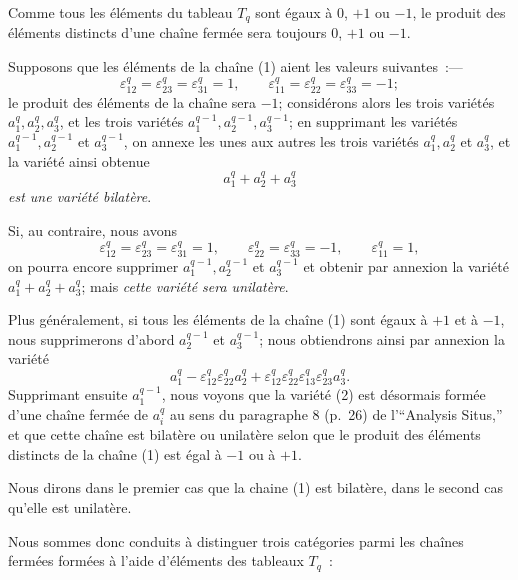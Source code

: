 \documentclass{article}
\begin{document}
Comme tous les éléments du tableau $T_{q}$ sont égaux à 0, $+1$ ou $-1$, le produit des éléments distincts d'une chaîne fermée sera toujours 0, $+1$ ou $-1$.

Supposons que les éléments de la chaîne (1) aient les valeurs suivantes~:---
\[ \varepsilon^{q}_{12} = \varepsilon^{q}_{23} = \varepsilon^{q}_{31} = 1, \qquad \varepsilon^{q}_{11} = \varepsilon^{q}_{22} = \varepsilon^{q}_{33} = -1; \]
le produit des éléments de la chaîne sera $-1$; considérons alors les trois variétés $a^{q}_{1}, a^{q}_{2}, a^{q}_{3}$, et les trois variétés $a^{q-1}_{1}, a^{q-1}_{2}, a^{q-1}_{3}$; en supprimant les variétés $a^{q-1}_{1}, a^{q-1}_{2}$ et $a^{q-1}_{3}$, on annexe les unes aux autres les trois variétés $a^{q}_{1}, a^{q}_{2}$ et $a^{q}_{3}$, et la variété ainsi obtenue
\[ a^{q}_{1} + a^{q}_{2} + a^{q}_{3} \]
\emph{est une variété bilatère}.

Si, au contraire, nous avons
\[ \varepsilon^{q}_{12} = \varepsilon^{q}_{23} = \varepsilon^{q}_{31} = 1, \qquad \varepsilon^{q}_{22} = \varepsilon^{q}_{33} = -1, \qquad \varepsilon^{q}_{11} = 1, \]
on pourra encore supprimer $a^{q-1}_{1}, a^{q-1}_{2}$ et $a^{q-1}_{3}$ et obtenir par annexion la variété $a^{q}_{1} + a^{q}_{2} + a^{q}_{3}$; mais \emph{cette variété sera unilatère}.

Plus généralement, si tous les éléments de la chaîne (1) sont égaux
à $+1$ et à $-1$, nous supprimerons d'abord $a^{q-1}_{2}$ et $a^{q-1}_{3}$; nous obtiendrons ainsi par annexion la variété
\[ a^{q}_{1} - \varepsilon^{q}_{12} \varepsilon^{q}_{22} a^{q}_{2} + \varepsilon^{q}_{12} \varepsilon^{q}_{22} \varepsilon^{q}_{13} \varepsilon^{q}_{23} a^{q}_{3}. \tag{2} \]
Supprimant ensuite $a^{q-1}_{1}$, nous voyons que la variété (2) est désormais formée d'une chaîne fermée de $a^{q}_{i}$ au sens du paragraphe 8 (p.\ 26) de l'“Analysis Situs,” et que cette chaîne est bilatère ou unilatère selon que le produit des éléments distincts de la chaîne (1) est égal à $-1$ ou à $+1$.

Nous dirons dans le premier cas que la chaine (1) est bilatère, dans le second cas qu'elle est unilatère.

Nous sommes donc conduits à distinguer trois catégories parmi les chaînes fermées formées à l'aide d'éléments des tableaux $T_{q}$~:
\end{document}
